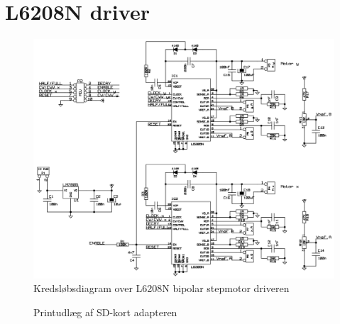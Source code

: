 \chapter{L6208N driver}
\label{b-l6208n}

\begin{figure}[htbp]
  \centering
  \includegraphics[width=\textwidth]{./img/l6208n-driver-diagram}
  \caption{Kredsløbsdiagram over L6208N bipolar stepmotor driveren}
  \label{fig:l6208n-diagram}
\end{figure}

\begin{figure}[htbp]
  \centering
  \caption{Printudlæg af SD-kort adapteren}
  \label{fig:l6208n-print}
\end{figure}
